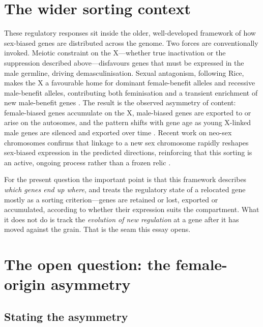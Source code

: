 \documentclass[11pt,a4paper]{article}
\begin{document}
\section{The wider sorting context}

These regulatory responses sit inside the older, well-developed framework of how sex-biased genes are distributed across the genome. Two forces are conventionally invoked. Meiotic constraint on the X---whether true inactivation or the suppression described above---disfavours genes that must be expressed in the male germline, driving demasculinisation. Sexual antagonism, following Rice, makes the X a favourable home for dominant female-benefit alleles and recessive male-benefit alleles, contributing both feminisation and a transient enrichment of new male-benefit genes \citep{rice1984,zhang2010,connallon2011}. The result is the observed asymmetry of content: female-biased genes accumulate on the X, male-biased genes are exported to or arise on the autosomes, and the pattern shifts with gene age as young X-linked male genes are silenced and exported over time \citep{zhang2010}. Recent work on neo-sex chromosomes confirms that linkage to a new sex chromosome rapidly reshapes sex-biased expression in the predicted directions, reinforcing that this sorting is an active, ongoing process rather than a frozen relic \citep{minovic2024}.

For the present question the important point is that this framework describes \emph{which genes end up where}, and treats the regulatory state of a relocated gene mostly as a sorting criterion---genes are retained or lost, exported or accumulated, according to whether their expression suits the compartment. What it does not do is track the \emph{evolution of new regulation} at a gene after it has moved against the grain. That is the seam this essay opens.

\section{The open question: the female-origin asymmetry}

\subsection{Stating the asymmetry}
\end{document}
